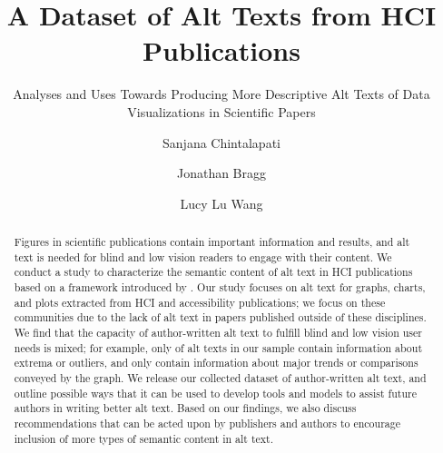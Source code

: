 \documentclass[sigconf]{acmart}
\begin{document}
\title{A Dataset of Alt Texts from HCI Publications}
\subtitle{Analyses and Uses Towards Producing More Descriptive Alt Texts of Data Visualizations in Scientific Papers}


\author{Sanjana Chintalapati}
\orcid{}

\author{Jonathan Bragg}
\orcid{}

\author{Lucy Lu Wang}


\renewcommand{\shortauthors}{S. Chintalapati, J. Bragg, and L.L. Wang}




\begin{abstract}
Figures in scientific publications contain important information and results, and alt text is needed for blind and low vision readers to engage with their content. We conduct a study to characterize the semantic content of alt text in HCI publications based on a framework introduced by \citet{Lundgard2022AccessibleVV}. Our study focuses on alt text for graphs, charts, and plots extracted from HCI and accessibility publications; we focus on these communities due to the lack of alt text in papers published outside of these disciplines. We find that the capacity of author-written alt text to fulfill blind and low vision user needs is mixed; for example, only \percleveltwo of alt texts in our sample contain information about extrema or outliers, and only \perclevelthree contain information about major trends or comparisons conveyed by the graph. We release our collected dataset of author-written alt text, and outline possible ways that it can be used to develop tools and models to assist future authors in writing better alt text. Based on our findings, we also discuss recommendations that can be acted upon by publishers and authors to encourage inclusion of more types of semantic content in alt text. 

\end{abstract}
\end{document}
